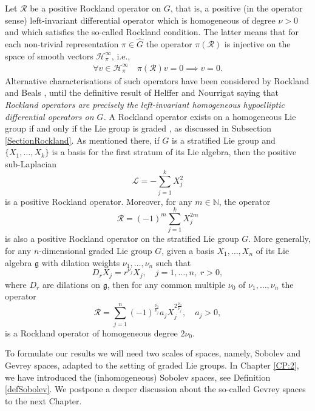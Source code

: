 \documentclass[12pt,oneside,a4paper]{book}
\numberwithin{equation}{section}     %
\theoremstyle{plain}
\theoremstyle{definition}
\newcommand{\slp}{{\mathcal L}}
\begin{document}
Let $\mathcal R$ be a positive Rockland operator on $G$, that is, a positive (in the operator sense) left-invariant differential operator which is homogeneous of degree $\nu>0$ and which satisfies the so-called Rockland condition. The latter means that for each non-trivial representation $\pi\in\widehat G$ the operator $\pi(\mathcal R)$ is injective on the space of smooth vectors $\mathcal H^\infty_\pi$, i.e.,
\begin{align}\label{Rockland}
\forall v\in\mathcal H^\infty_\pi \quad \pi(\mathcal R)v=0\implies v=0.
\end{align}
Alternative characterisations of such operators have been considered by Rockland \cite{Rockland} and Beals \cite{Beals-Rockland}, until the definitive result of Helffer and Nourrigat \cite{HN-79} saying that {\em Rockland operators are precisely the left-invariant homogeneous hypoelliptic differential operators on $G$.} A Rockland operator exists on a homogeneous Lie group if and only if the Lie group is graded \cite{Miller:80, tER:97}, as discussed in Subsection \ref{SectionRockland}. As mentioned there, if $G$ is a stratified Lie group and $\{X_1,\dots,X_k\}$ is a basis for the first stratum of its Lie algebra, then the positive sub-Laplacian 
\[
\slp=-\sum_{j=1}^{k}X_j^2
\]
is a positive Rockland operator. Moreover, for any $m\in\mathbb N$, the operator
$$
\mathcal R=(-1)^{m}\sum_{j=1}^{k}X_j^{2m}
$$
is also a positive Rockland operator on the stratified Lie group $G$. More generally, for any $n$-dimensional graded Lie group $G$, given a basis $X_1,\ldots,X_n$ of its Lie algebra $\mathfrak g$ with dilation weights $\nu_1,\ldots,\nu_n$ such that
\begin{equation}\label{EQ:dils}
D_r X_j=r^{\nu_j} X_j,\quad j=1,\ldots,n,\; r>0,
\end{equation} 
where $D_r$ are dilations on $\mathfrak g$, then for any common multiple $\nu_0$ of $\nu_1,\ldots,\nu_n$
the operator
$$
\mathcal R=\sum_{j=1}^n (-1)^{\frac{\nu_0}{\nu_j}} a_j X_j^{2\frac{\nu_0}{\nu_j}},\quad a_j>0,
$$
is a Rockland operator of homogeneous degree $2\nu_0$. 

To formulate our results we will need two scales of spaces, namely, Sobolev and Gevrey spaces, adapted to the setting of graded Lie groups. In Chapter \ref{CP:2}, we have introduced the (inhomogeneous) Sobolev spaces, see Definition \ref{defSobolev}. We postpone a deeper discussion about the so-called Gevrey spaces to the next Chapter. 
\end{document}
